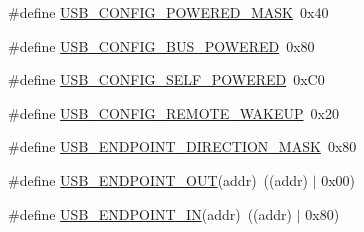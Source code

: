 \begin{DoxyCompactItemize}
\item 
\#define \hyperlink{group__USBD__Core_gafdd4f846b5497985c182a1a090d99729}{U\-S\-B\-\_\-\-C\-O\-N\-F\-I\-G\-\_\-\-P\-O\-W\-E\-R\-E\-D\-\_\-\-M\-A\-S\-K}~0x40
\item 
\#define \hyperlink{group__USBD__Core_ga63c0a08ce70650c3c677ab523a45a0bb}{U\-S\-B\-\_\-\-C\-O\-N\-F\-I\-G\-\_\-\-B\-U\-S\-\_\-\-P\-O\-W\-E\-R\-E\-D}~0x80
\item 
\#define \hyperlink{group__USBD__Core_ga8c322771b797c09e3066a388b46e9ef9}{U\-S\-B\-\_\-\-C\-O\-N\-F\-I\-G\-\_\-\-S\-E\-L\-F\-\_\-\-P\-O\-W\-E\-R\-E\-D}~0x\-C0
\item 
\#define \hyperlink{group__USBD__Core_ga7b28a766a8a916fae421d52fbedd2cba}{U\-S\-B\-\_\-\-C\-O\-N\-F\-I\-G\-\_\-\-R\-E\-M\-O\-T\-E\-\_\-\-W\-A\-K\-E\-U\-P}~0x20
\end{DoxyCompactItemize}
\begin{DoxyCompactItemize}
\item 
\#define \hyperlink{group__USBD__Core_gab7544c5b8cf975839422c1ce29d4c5cb}{U\-S\-B\-\_\-\-E\-N\-D\-P\-O\-I\-N\-T\-\_\-\-D\-I\-R\-E\-C\-T\-I\-O\-N\-\_\-\-M\-A\-S\-K}~0x80
\item 
\#define \hyperlink{group__USBD__Core_ga81ac2a8c9688d35940a054c4194c278d}{U\-S\-B\-\_\-\-E\-N\-D\-P\-O\-I\-N\-T\-\_\-\-O\-U\-T}(addr)~((addr) $\vert$ 0x00)
\item 
\#define \hyperlink{group__USBD__Core_gabe258bf57244c49874da6d53679e6df8}{U\-S\-B\-\_\-\-E\-N\-D\-P\-O\-I\-N\-T\-\_\-\-I\-N}(addr)~((addr) $\vert$ 0x80)
\end{DoxyCompactItemize}
